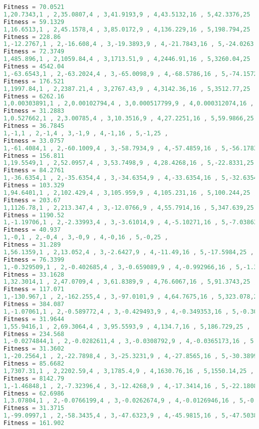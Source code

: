 \documentclass[10pt,b5paper]{article}
\begin{document}
\begin{lstlisting}[language=c++]
Fitness = 70.0521
1,20.7343,1 , 2,35.0807,4 , 3,41.9193,9 , 4,43.5132,16 , 5,42.3376,25 , 
Fitness = 59.1329
1,16.6513,1 , 2,45.1578,4 , 3,85.0172,9 , 4,136.229,16 , 5,198.794,25 , 
Fitness = 228.86
1,-12.2767,1 , 2,-16.608,4 , 3,-19.3893,9 , 4,-21.7843,16 , 5,-24.0263,25 , 
Fitness = 72.3749
1,485.896,1 , 2,1059.84,4 , 3,1713.51,9 , 4,2446.91,16 , 5,3260.04,25 , 
Fitness = 4542.04
1,-63.6543,1 , 2,-63.2024,4 , 3,-65.0098,9 , 4,-68.5786,16 , 5,-74.1572,25 , 
Fitness = 176.521
1,1997.84,1 , 2,2387.21,4 , 3,2767.43,9 , 4,3142.36,16 , 5,3512.77,25 , 
Fitness = 6262.16
1,0.00303891,1 , 2,0.00102794,4 , 3,0.000517799,9 , 4,0.000312074,16 , 5,0.000208673,25 , 
Fitness = 31.2883
1,0.527662,1 , 2,3.00785,4 , 3,10.3516,9 , 4,27.2251,16 , 5,59.9866,25 , 
Fitness = 36.7845
1,-1,1 , 2,-1,4 , 3,-1,9 , 4,-1,16 , 5,-1,25 , 
Fitness = 33.0757
1,-61.4084,1 , 2,-60.1009,4 , 3,-58.7934,9 , 4,-57.4859,16 , 5,-56.1783,25 , 
Fitness = 156.811
1,19.5549,1 , 2,52.0957,4 , 3,53.7498,9 , 4,28.4268,16 , 5,-22.8331,25 , 
Fitness = 84.2761
1,-36.6354,1 , 2,-35.6354,4 , 3,-34.6354,9 , 4,-33.6354,16 , 5,-32.6354,25 , 
Fitness = 103.329
1,94.6401,1 , 2,102.429,4 , 3,105.959,9 , 4,105.231,16 , 5,100.244,25 , 
Fitness = 203.67
1,1126.78,1 , 2,213.347,4 , 3,-12.0766,9 , 4,55.7914,16 , 5,347.639,25 , 
Fitness = 1190.52
1,-1.19706,1 , 2,-2.33993,4 , 3,-3.61014,9 , 4,-5.10271,16 , 5,-7.03863,25 , 
Fitness = 40.937
1,-0,1 , 2,-0,4 , 3,-0,9 , 4,-0,16 , 5,-0,25 , 
Fitness = 31.289
1,56.1359,1 , 2,13.052,4 , 3,-2.6427,9 , 4,-11.49,16 , 5,-17.5984,25 , 
Fitness = 76.3399
1,-0.329509,1 , 2,-0.402685,4 , 3,-0.659089,9 , 4,-0.992966,16 , 5,-1.39238,25 , 
Fitness = 33.1628
1,32.3014,1 , 2,47.0709,4 , 3,61.8389,9 , 4,76.6067,16 , 5,91.3743,25 , 
Fitness = 117.071
1,-130.967,1 , 2,-162.255,4 , 3,-97.0101,9 , 4,64.7675,16 , 5,323.078,25 , 
Fitness = 384.087
1,-1.07061,1 , 2,-0.589772,4 , 3,-0.429493,9 , 4,-0.349353,16 , 5,-0.301269,25 , 
Fitness = 31.9644
1,55.9416,1 , 2,69.3064,4 , 3,95.5593,9 , 4,134.7,16 , 5,186.729,25 , 
Fitness = 234.568
1,-0.0274844,1 , 2,-0.0282611,4 , 3,-0.0308792,9 , 4,-0.0365173,16 , 5,-0.0490574,25 , 
Fitness = 31.3602
1,-20.2564,1 , 2,-22.7898,4 , 3,-25.3231,9 , 4,-27.8565,16 , 5,-30.3899,25 , 
Fitness = 85.6682
1,7307.31,1 , 2,2202.59,4 , 3,1785.4,9 , 4,1630.76,16 , 5,1550.14,25 , 
Fitness = 8142.79
1,-1.46848,1 , 2,-7.32396,4 , 3,-12.4268,9 , 4,-17.3414,16 , 5,-22.1808,25 , 
Fitness = 62.6986
1,3.07804,1 , 2,-0.0766199,4 , 3,-0.0262674,9 , 4,-0.0126946,16 , 5,-0.00711245,25 , 
Fitness = 31.3715
1,-99.0997,1 , 2,-58.3435,4 , 3,-47.6323,9 , 4,-45.9815,16 , 5,-47.5038,25 , 
Fitness = 161.902

\end{lstlisting}
\end{document}
